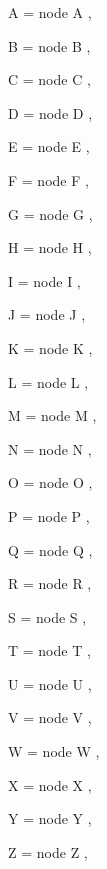 A = {
  node {A}
},

B = {
  node {B}
},

C = {
  node {C}
},

D = {
  node {D}
},

E = {
  node {E}
},

F = {
  node {F}
},

G = {
  node {G}
},

H = {
  node {H}
},

I = {
  node {I}
},

J = {
  node {J}
},

K = {
  node {K}
},

L = {
  node {L}
},

M = {
  node {M}
},

N = {
  node {N}
},

O = {
  node {O}
},

P = {
  node {P}
},

Q = {
  node {Q}
},

R = {
  node {R}
},

S = {
  node {S}
},

T = {
  node {T}
},

U = {
  node {U}
},

V = {
  node {V}
},

W = {
  node {W}
},

X = {
  node {X}
},

Y = {
  node {Y}
},

Z = {
  node {Z}
},